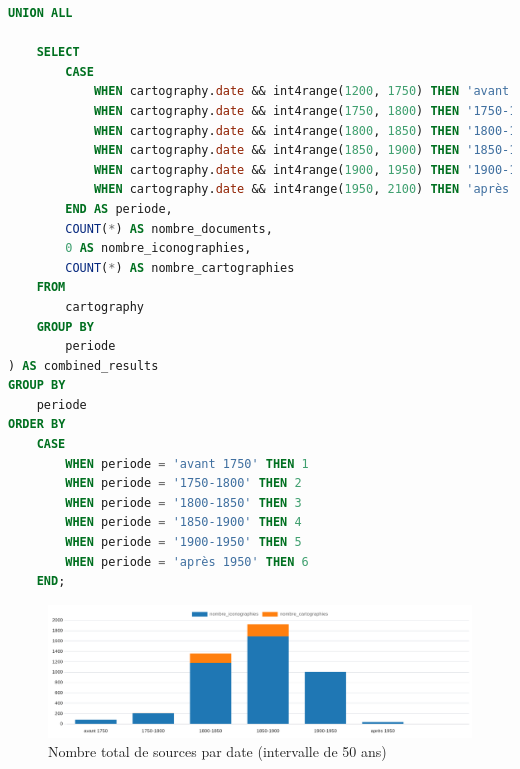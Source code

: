 \begin{enumerate}
\begin{enumerate}
\begin{lstlisting}[language=SQL, caption=Nombre de sources par date (50 ans)]
    UNION ALL

    SELECT 
        CASE 
            WHEN cartography.date && int4range(1200, 1750) THEN 'avant 1750'
            WHEN cartography.date && int4range(1750, 1800) THEN '1750-1800'
            WHEN cartography.date && int4range(1800, 1850) THEN '1800-1850'
            WHEN cartography.date && int4range(1850, 1900) THEN '1850-1900'
            WHEN cartography.date && int4range(1900, 1950) THEN '1900-1950'
            WHEN cartography.date && int4range(1950, 2100) THEN 'après 1950'
        END AS periode,
        COUNT(*) AS nombre_documents,
        0 AS nombre_iconographies,
        COUNT(*) AS nombre_cartographies
    FROM 
        cartography
    GROUP BY 
        periode
) AS combined_results
GROUP BY 
    periode
ORDER BY 
    CASE 
        WHEN periode = 'avant 1750' THEN 1
        WHEN periode = '1750-1800' THEN 2
        WHEN periode = '1800-1850' THEN 3
        WHEN periode = '1850-1900' THEN 4
        WHEN periode = '1900-1950' THEN 5
        WHEN periode = 'après 1950' THEN 6
    END; \end{lstlisting}
\begin{figure}[ht!]
    \centering
    \includegraphics[width=0.75\linewidth]{images/graphiques/total_source_date_50.png}
    \caption{Nombre total de sources par date (intervalle de 50 ans)}
    \label{fig:total_sources_date50}
\end{figure}

\newpage    


\end{enumerate}
\end{enumerate}
